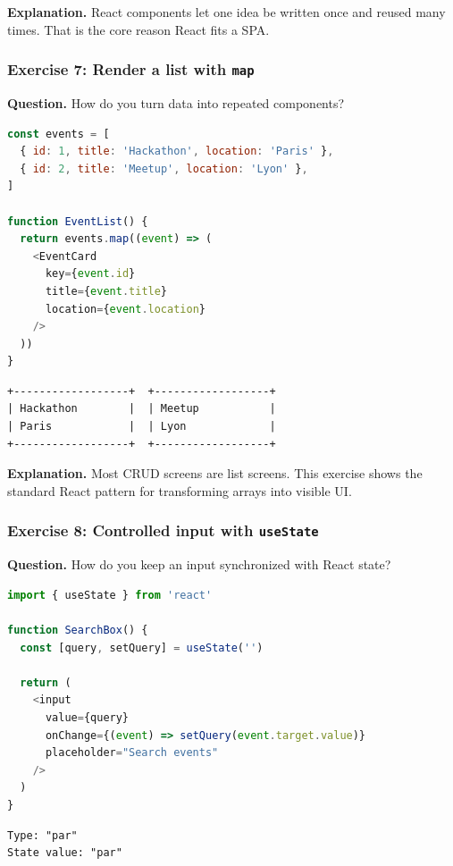 \documentclass[11pt,a4paper]{article}
\begin{document}
\textbf{Explanation.} React components let one idea be written once and reused many times. That is the core reason React fits a SPA.

\subsubsection*{Exercise 7: Render a list with \texttt{map}}
\textbf{Question.} How do you turn data into repeated components?

\begin{lstlisting}[style=code, language=JavaScript]
const events = [
  { id: 1, title: 'Hackathon', location: 'Paris' },
  { id: 2, title: 'Meetup', location: 'Lyon' },
]

function EventList() {
  return events.map((event) => (
    <EventCard
      key={event.id}
      title={event.title}
      location={event.location}
    />
  ))
}
\end{lstlisting}

\begin{lstlisting}[style=terminal]
+------------------+  +------------------+
| Hackathon        |  | Meetup           |
| Paris            |  | Lyon             |
+------------------+  +------------------+
\end{lstlisting}

\textbf{Explanation.} Most CRUD screens are list screens. This exercise shows the standard React pattern for transforming arrays into visible UI.

\subsubsection*{Exercise 8: Controlled input with \texttt{useState}}
\textbf{Question.} How do you keep an input synchronized with React state?

\begin{lstlisting}[style=code, language=JavaScript]
import { useState } from 'react'

function SearchBox() {
  const [query, setQuery] = useState('')

  return (
    <input
      value={query}
      onChange={(event) => setQuery(event.target.value)}
      placeholder="Search events"
    />
  )
}
\end{lstlisting}

\begin{lstlisting}[style=terminal]
Type: "par"
State value: "par"
\end{lstlisting}
\end{document}
